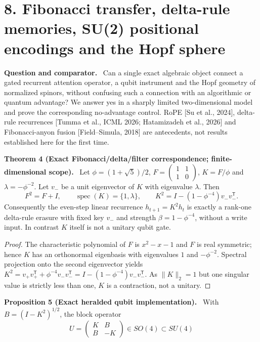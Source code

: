 \documentclass[11pt,a4paper,oneside]{book}
\DeclareMathOperator{\spec}{spec}\DeclareMathOperator{\diag}{diag}
\newcommand{\statement}[3]{\par\medskip\noindent\textbf{#1 #2 (#3).}\ }
\newcommand{\note}[1]{\par\medskip\noindent\textbf{#1}\ }
\begin{document}
\section*{8. Fibonacci transfer, delta-rule memories, SU(2) positional encodings and the Hopf sphere}
\note{Question and comparator.} Can a single exact algebraic object connect a gated recurrent attention operator, a qubit instrument and the Hopf geometry of normalized spinors, without confusing such a connection with an algorithmic or quantum advantage? We answer yes in a sharply limited two-dimensional model and prove the corresponding no-advantage control. RoPE [Su et al., 2024], delta-rule recurrences [Tumma et al., ICML 2026; Hatamizadeh et al., 2026] and Fibonacci-anyon fusion [Field--Simula, 2018] are antecedents, not results established here for the first time.
\statement{Theorem}{4}{Exact Fibonacci/delta/filter correspondence; finite-dimensional scope} Let $\phi=(1+\sqrt5)/2$, $F=\left(\begin{smallmatrix}1&1\\1&0\end{smallmatrix}\right)$, $K=F/\phi$ and $\lambda=-\phi^{-2}$. Let $v_-$ be a unit eigenvector of $K$ with eigenvalue $\lambda$. Then
\begin{equation}F^2=F+I,\qquad\spec(K)=\{1,\lambda\},\qquad K^2=I-(1-\phi^{-4})v_-v_-^{\mathsf T}.\tag{9}\end{equation}
Consequently the even-step linear recurrence $h_{t+1}=K^2h_t$ is exactly a rank-one delta-rule erasure with fixed key $v_-$ and strength $\beta=1-\phi^{-4}$, without a write input. In contrast $K$ itself is not a unitary qubit gate.
\begin{proof}The characteristic polynomial of $F$ is $x^2-x-1$ and $F$ is real symmetric; hence $K$ has an orthonormal eigenbasis with eigenvalues $1$ and $-\phi^{-2}$. Spectral projection onto the second eigenvector yields $K^2=v_+v_+^{\mathsf T}+\phi^{-4}v_-v_-^{\mathsf T}=I-(1-\phi^{-4})v_-v_-^{\mathsf T}$. As $\|K\|_2=1$ but one singular value is strictly less than one, $K$ is a contraction, not a unitary.\end{proof}
\statement{Proposition}{5}{Exact heralded qubit implementation} With $B=(I-K^2)^{1/2}$, the block operator
\begin{equation}U=\begin{pmatrix}K&B\\B&-K\end{pmatrix}\in SO(4)\subset SU(4)\tag{10}\end{equation}
\end{document}
